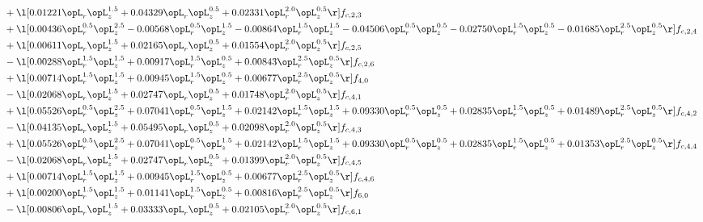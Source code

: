\begin{alignat}{2}
& + \l[  0.01221 \opL_r \opL_z^{1.5} +  0.04329 \opL_r \opL_z^{0.5} +  0.02331 \opL_r^{2.0} \opL_z^{0.5}  \r] f_{c,2,3} \nonumber \\ 
& + \l[  0.00436 \opL_r^{0.5} \opL_z^{2.5}   -0.00568 \opL_r^{0.5} \opL_z^{1.5}   -0.00864 \opL_r^{1.5} \opL_z^{1.5}   -0.04506 \opL_r^{0.5} \opL_z^{0.5}   -0.02750 \opL_r^{1.5} \opL_z^{0.5}   -0.01685 \opL_r^{2.5} \opL_z^{0.5}  \r] f_{c,2,4} \nonumber \\ 
& + \l[  0.00611 \opL_r \opL_z^{1.5} +  0.02165 \opL_r \opL_z^{0.5} +  0.01554 \opL_r^{2.0} \opL_z^{0.5}  \r] f_{c,2,5} \nonumber \\ 
& - \l[  0.00288 \opL_r^{1.5} \opL_z^{1.5} +  0.00917 \opL_r^{1.5} \opL_z^{0.5} +  0.00843 \opL_r^{2.5} \opL_z^{0.5}  \r] f_{c,2,6} \nonumber \\ 
& + \l[  0.00714 \opL_r^{1.5} \opL_z^{1.5} +  0.00945 \opL_r^{1.5} \opL_z^{0.5} +  0.00677 \opL_r^{2.5} \opL_z^{0.5}  \r] f_{4,0} \nonumber \\ 
& - \l[  0.02068 \opL_r \opL_z^{1.5} +  0.02747 \opL_r \opL_z^{0.5} +  0.01748 \opL_r^{2.0} \opL_z^{0.5}  \r] f_{c,4,1} \nonumber \\ 
& + \l[  0.05526 \opL_r^{0.5} \opL_z^{2.5} +  0.07041 \opL_r^{0.5} \opL_z^{1.5} +  0.02142 \opL_r^{1.5} \opL_z^{1.5} +  0.09330 \opL_r^{0.5} \opL_z^{0.5} +  0.02835 \opL_r^{1.5} \opL_z^{0.5} +  0.01489 \opL_r^{2.5} \opL_z^{0.5}  \r] f_{c,4,2} \nonumber \\ 
& - \l[  0.04135 \opL_r \opL_z^{1.5} +  0.05495 \opL_r \opL_z^{0.5} +  0.02098 \opL_r^{2.0} \opL_z^{0.5}  \r] f_{c,4,3} \nonumber \\ 
& + \l[  0.05526 \opL_r^{0.5} \opL_z^{2.5} +  0.07041 \opL_r^{0.5} \opL_z^{1.5} +  0.02142 \opL_r^{1.5} \opL_z^{1.5} +  0.09330 \opL_r^{0.5} \opL_z^{0.5} +  0.02835 \opL_r^{1.5} \opL_z^{0.5} +  0.01353 \opL_r^{2.5} \opL_z^{0.5}  \r] f_{c,4,4} \nonumber \\ 
& - \l[  0.02068 \opL_r \opL_z^{1.5} +  0.02747 \opL_r \opL_z^{0.5} +  0.01399 \opL_r^{2.0} \opL_z^{0.5}  \r] f_{c,4,5} \nonumber \\ 
& + \l[  0.00714 \opL_r^{1.5} \opL_z^{1.5} +  0.00945 \opL_r^{1.5} \opL_z^{0.5} +  0.00677 \opL_r^{2.5} \opL_z^{0.5}  \r] f_{c,4,6} \nonumber \\ 
& + \l[  0.00200 \opL_r^{1.5} \opL_z^{1.5} +  0.01141 \opL_r^{1.5} \opL_z^{0.5} +  0.00816 \opL_r^{2.5} \opL_z^{0.5}  \r] f_{6,0} \nonumber \\ 
& - \l[  0.00806 \opL_r \opL_z^{1.5} +  0.03333 \opL_r \opL_z^{0.5} +  0.02105 \opL_r^{2.0} \opL_z^{0.5}  \r] f_{c,6,1} \nonumber \\ 

\end{alignat}
